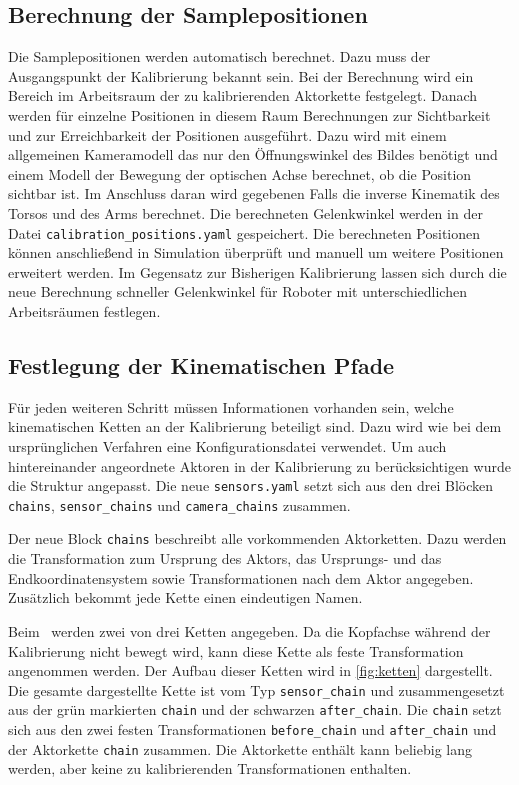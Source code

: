 \subsection{Berechnung der Samplepositionen}
\label{sub:Berechnung der Samplepositionen}
Die Samplepositionen werden automatisch berechnet. Dazu muss der Ausgangspunkt 
der Kalibrierung bekannt sein. Bei der Berechnung wird ein Bereich im Arbeitsraum
der zu kalibrierenden Aktorkette festgelegt. Danach werden für einzelne
Positionen in diesem Raum Berechnungen zur Sichtbarkeit und zur Erreichbarkeit 
der Positionen ausgeführt. Dazu wird mit einem allgemeinen Kameramodell das nur
den Öffnungswinkel des Bildes benötigt und einem Modell der Bewegung der 
optischen Achse berechnet, ob die Position sichtbar ist. Im Anschluss daran wird
gegebenen Falls die inverse Kinematik des Torsos und des Arms berechnet. Die 
berechneten Gelenkwinkel werden in der Datei \texttt{calibration\_positions.yaml}
gespeichert. Die berechneten Positionen können anschließend in Simulation
überprüft und manuell um weitere Positionen erweitert werden. Im Gegensatz zur 
Bisherigen Kalibrierung lassen sich durch die neue Berechnung schneller
Gelenkwinkel für Roboter mit unterschiedlichen Arbeitsräumen festlegen. 

\subsection{Festlegung der Kinematischen Pfade}
\label{sub:Festlegung der Kinematischen Pfade}
Für jeden weiteren Schritt müssen Informationen vorhanden sein, welche
kinematischen Ketten an der Kalibrierung beteiligt sind. Dazu wird wie bei dem 
ursprünglichen Verfahren eine Konfigurationsdatei verwendet. Um auch 
hintereinander angeordnete Aktoren in der Kalibrierung zu berücksichtigen wurde 
die Struktur angepasst. Die neue \texttt{sensors.yaml} setzt sich aus den drei
Blöcken \texttt{chains}, \texttt{sensor\_chains} und \texttt{camera\_chains}
zusammen.

Der neue Block \texttt{chains} beschreibt alle vorkommenden Aktorketten. Dazu 
werden die Transformation zum Ursprung des Aktors, das Ursprungs- und das 
Endkoordinatensystem sowie Transformationen nach dem Aktor angegeben. Zusätzlich
bekommt jede Kette einen eindeutigen Namen.

Beim \cob\ werden zwei von drei Ketten angegeben. Da die Kopfachse während der
Kalibrierung nicht bewegt wird, kann diese Kette als feste Transformation 
angenommen werden. Der Aufbau dieser Ketten wird in \ref{fig:ketten}
dargestellt. Die gesamte dargestellte Kette ist vom Typ \texttt{sensor\_chain}
und zusammengesetzt aus der grün markierten \texttt{chain} und der schwarzen 
  \texttt{after\_chain}. Die \texttt{chain} setzt sich aus den zwei festen 
  Transformationen \texttt{before\_chain} und \texttt{after\_chain} und der
  Aktorkette \texttt{chain} zusammen. Die Aktorkette enthält kann beliebig 
  lang werden, aber keine zu kalibrierenden Transformationen enthalten.

